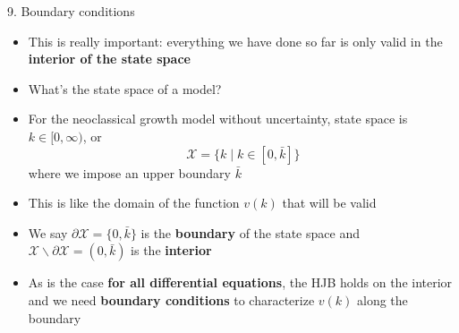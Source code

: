 \documentclass[11pt, aspectratio=169]{beamer}
\begin{document}
\begin{frame}{9. Boundary conditions}

{\small
\begin{itemize}
\item This is really important: everything we have done so far is only valid in the \textbf{interior of the state space}

\item What's the state space of a model? 

\item For the neoclassical growth model without uncertainty, state space is $k \in [0, \infty)$, or 
\begin{equation*}
	\mathcal X = \Big\{ k \mid k \in [0, \bar k] \Big\}
\end{equation*}
where we impose an upper boundary $\bar k$ 

\item This is like the domain of the function $v(k)$ that will be valid 

\item We say $\partial \mathcal X = \{ 0, \bar k \}$ is the \textbf{boundary} of the state space and $\mathcal X \backslash \partial \mathcal X = (0, \bar k)$ is the \textbf{interior}

\item As is the case \textbf{for all differential equations}, the HJB holds on the interior and we need \textbf{boundary conditions} to characterize $v(k)$ along the boundary 
\end{itemize}
}
\end{frame}
\end{document}
